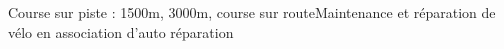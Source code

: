 

\begin{cventries}

  \cventry
    {} %
    {Course sur piste : 1500m, 3000m, course sur route\newline Maintenance et réparation de vélo en association d'auto réparation} %
    {} %
    {} %
    {
    }

\end{cventries}
